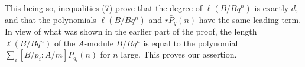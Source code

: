 This being so, inequalities (7) prove that the degree of $\ell(B/Bq^n)$ is exactly $d$, and that the polynomials $\ell(B/Bq^n)$ and $r\bar{P}_{q}(n)$ have the same leading term. In view of what was shown in the earlier part of the proof, the length $\ell(B/Bq^n)$ of the $A$-module $B/Bq^n$ is equal to the polynomial $\sum_i [B/p_i:A/m] \bar{P}_{q_i}(n)$ for $n$ large. This proves our assertion.
